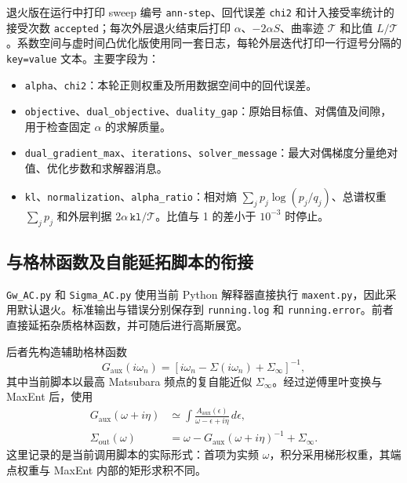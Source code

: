 \documentclass[UTF8,fontset=fandol,11pt]{ctexart}
\begin{document}
退火版在运行中打印 sweep 编号 \texttt{ann-step}、回代误差 \texttt{chi2} 和计入接受率统计的接受次数 \texttt{accepted}；每次外层退火结束后打印 $\alpha$、$-2\alpha S$、曲率迹 $\mathcal T$ 和比值 $L/\mathcal T$。系数空间与虚时间凸优化版使用同一套日志，每轮外层迭代打印一行逗号分隔的 \texttt{key=value} 文本。主要字段为：
\begin{itemize}
    \item \texttt{alpha}、\texttt{chi2}：本轮正则权重及所用数据空间中的回代误差。
    \item \texttt{objective}、\texttt{dual\_objective}、\texttt{duality\_gap}：原始目标值、对偶值及间隙，用于检查固定 $\alpha$ 的求解质量。
    \item \texttt{dual\_gradient\_max}、\texttt{iterations}、\texttt{solver\_message}：最大对偶梯度分量绝对值、优化步数和求解器消息。
    \item \texttt{kl}、\texttt{normalization}、\texttt{alpha\_ratio}：相对熵 $\sum_j p_j\log(p_j/q_j)$、总谱权重 $\sum_j p_j$ 和外层判据 $2\alpha\,\texttt{kl}/\mathcal T$。比值与 1 的差小于 $10^{-3}$ 时停止。
\end{itemize}

\subsection{与格林函数及自能延拓脚本的衔接}
\texttt{Gw\_AC.py} 和 \texttt{Sigma\_AC.py} 使用当前 Python 解释器直接执行 \texttt{maxent.py}，因此采用默认退火。标准输出与错误分别保存到 \texttt{running.log} 和 \texttt{running.error}。前者直接延拓杂质格林函数，并可随后进行高斯展宽。

后者先构造辅助格林函数
\begin{equation}
    G_{\mathrm{aux}}(i\omega_n)=\left[i\omega_n-\Sigma(i\omega_n)+\Sigma_\infty\right]^{-1},
\end{equation}
其中当前脚本以最高 Matsubara 频点的复自能近似 $\Sigma_\infty$。经过逆傅里叶变换与 MaxEnt 后，使用
\begin{align}
    G_{\mathrm{aux}}(\omega+i\eta)&\simeq\int\frac{A_{\mathrm{aux}}(\epsilon)}{\omega-\epsilon+i\eta}\,d\epsilon,\\
    \Sigma_{\mathrm{out}}(\omega)&=\omega-G_{\mathrm{aux}}(\omega+i\eta)^{-1}+\Sigma_\infty.
\end{align}
这里记录的是当前调用脚本的实际形式：首项为实频 $\omega$，积分采用梯形权重，其端点权重与 MaxEnt 内部的矩形求积不同。
\end{document}
